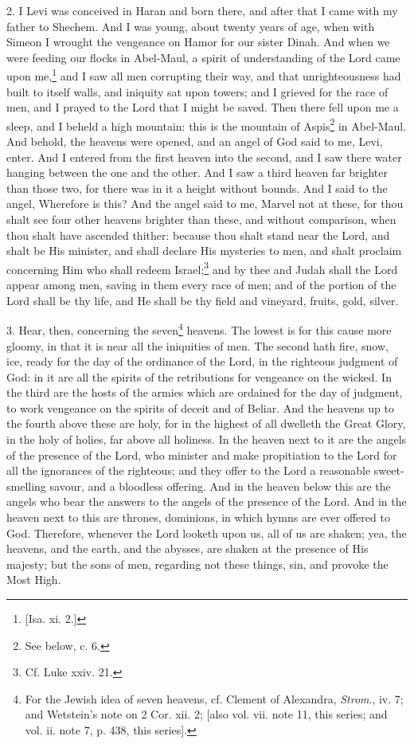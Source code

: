 2. I Levi was conceived in Haran and born there, and after that I came with my father to Shechem. And I was young, about twenty years of age, when with Simeon I wrought the vengeance on Hamor for our sister Dinah. And when we were feeding our flocks in Abel-Maul, a spirit of understanding of the Lord came upon me,\footnote{[Isa. xi. 2.]} and I saw all men corrupting their way, and that unrighteousness had built to itself walls, and iniquity sat upon towers; and I grieved for the race of men, and I prayed to the Lord that I might be saved. Then there fell upon me a sleep, and I beheld a high mountain: this is the mountain of Aspis\footnote{See below, c. 6.} in Abel-Maul. And behold, the heavens were opened, and an angel of God said to me, Levi, enter. And I entered from the first heaven into the second, and I saw there water hanging between the one and the other. And I saw a third heaven far brighter than those two, for there was in it a height without bounds. And I said to the angel, Wherefore is this? And the angel said to me, Marvel not at these, for thou shalt see four other heavens brighter than these, and without comparison, when thou shalt have ascended thither: because thou shalt stand near the Lord, and shalt be His minister, and shall declare His mysteries to men, and shalt proclaim concerning Him who shall redeem Israel;\footnote{Cf. Luke xxiv. 21.} and by thee and Judah shall the Lord appear among men, saving in them every race of men; and of the portion of the Lord shall be thy life, and He shall be thy field and vineyard, fruits, gold, silver.

3. Hear, then, concerning the seven\footnote{For the Jewish idea of seven heavens, cf. Clement of Alexandra, \emph{Strom}., iv. 7; and Wetstein’s note on 2 Cor. xii. 2; [also vol. vii. note 11, this series; and vol. ii. note 7, p. 438, this series].} heavens. The lowest is for this cause more gloomy, in that it is near all the iniquities of men. The second hath fire, snow, ice, ready for the day of the ordinance of the Lord, in the righteous judgment of God: in it are all the spirits of the retributions for vengeance on the wicked. In the third are the hosts of the armies which are ordained for the day of judgment, to work vengeance on the spirits of deceit and of Beliar. And the heavens up to the fourth above these are holy, for in the highest of all dwelleth the Great Glory, in the holy of holies, far above all holiness. In the heaven next to it are the angels of the presence of the Lord, who minister and make propitiation to the Lord for all the ignorances of the righteous; and they offer to the Lord a reasonable sweet-smelling savour, and a bloodless offering. And in the heaven below this are the angels who bear the answers to the angels of the presence of the Lord. And in the heaven next to this are thrones, dominions, in which hymns are ever offered to God. Therefore, whenever the Lord looketh upon us, all of us are shaken; yea, the heavens, and the earth, and the abysses, are shaken at the presence of His majesty; but the sons of men, regarding not these things, sin, and provoke the Most High.

